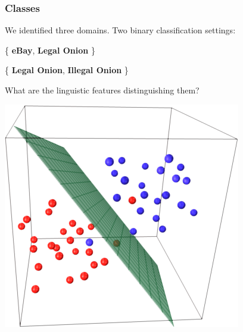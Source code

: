 \documentclass[t,xcolor={svgnames,table},aspectratio=169]{beamer}
\begin{document}
\begin{frame}
	\frametitle{Classes}
	\LARGE
	We identified three domains. Two binary classification settings:
	\begin{center}\LARGE
	\{ \textbf{\color{yellow} eBay}, \textbf{\color{green} Legal Onion} \}
	\vfill
	
	\{ \textbf{\color{green} Legal Onion}, \textbf{\color{red} Illegal Onion} \}
	\end{center}
	\vfill
	\pause
	
	What are the linguistic features distinguishing them?
	\vfill
	
	\begin{center}
	\includegraphics[width=.2\textwidth]{svm.png}
	\end{center}
\end{frame}
\end{document}
